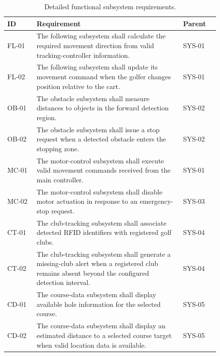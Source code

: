 
\begin{table}[H]
\centering
\caption{Detailed functional subsystem requirements.}
\label{tab:app-functional}
\footnotesize
\begin{tabular}{p{0.12\linewidth} p{0.60\linewidth} p{0.15\linewidth}}
\hline
\textbf{ID} & \textbf{Requirement} & \textbf{Parent} \\
\hline
FL-01 & The following subsystem shall calculate the required movement direction from valid tracking-controller information. & SYS-01 \\
FL-02 & The following subsystem shall update its movement command when the golfer changes position relative to the cart. & SYS-01 \\
OB-01 & The obstacle subsystem shall measure distances to objects in the forward detection region. & SYS-02 \\
OB-02 & The obstacle subsystem shall issue a stop request when a detected obstacle enters the stopping zone. & SYS-02 \\
MC-01 & The motor-control subsystem shall execute valid movement commands received from the main controller. & SYS-01 \\
MC-02 & The motor-control subsystem shall disable motor actuation in response to an emergency-stop request. & SYS-03 \\
CT-01 & The club-tracking subsystem shall associate detected RFID identifiers with registered golf clubs. & SYS-04 \\
CT-02 & The club-tracking subsystem shall generate a missing-club alert when a registered club remains absent beyond the configured detection interval. & SYS-04 \\
CD-01 & The course-data subsystem shall display available hole information for the selected course. & SYS-05 \\
CD-02 & The course-data subsystem shall display an estimated distance to a selected course target when valid location data is available. & SYS-05 \\
\hline
\end{tabular}
\end{table}


